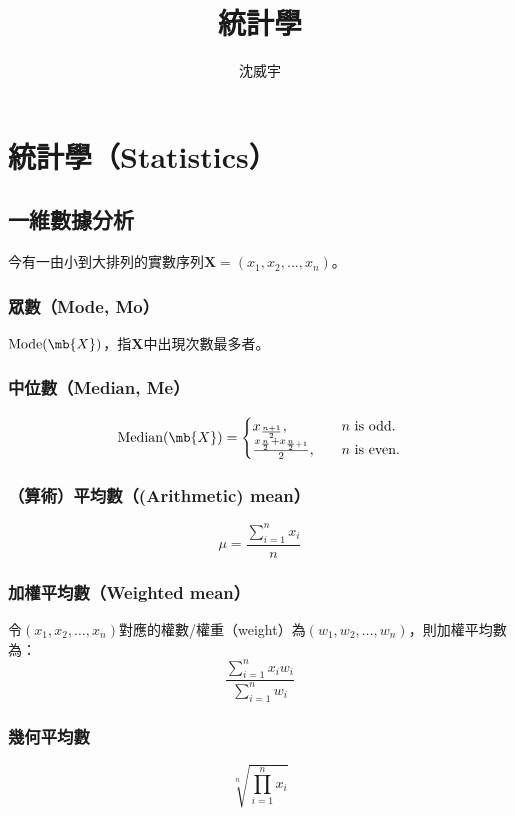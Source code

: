 \documentclass[a4paper,12pt]{report}
\begin{document}
\title{統計學}
\author{沈威宇}
\date{\temtoday}
\titletocdoc
\chapter{統計學（Statistics）}
\section{一維數據分析}
今有一由小到大排列的實數序列\(\mathbf{X}=(x_1,x_2,\ldots,x_n)\)。
\subsection{眾數（Mode, Mo）}
$\text{Mode}(\mb{X})$，指$\mathbf{X}$中出現次數最多者。
\subsection{中位數（Median, Me）}
\[ \text{Median}(\mb{X})=\begin{cases}
x_{\frac{n+1}{2}},\quad & n\text{\ is odd.}\\
\frac{x_{\frac{n}{2}}+x_{\frac{n}{2}+1}}{2},\quad & n\text{\ is even.}
\end{cases} \]
\subsection{（算術）平均數（(Arithmetic) mean）}
\[\mu=\frac{\sum_{i=1}^n x_i}{n}\]
\subsection{加權平均數（Weighted mean）}
令\((x_1,x_2,\ldots,x_n)\)對應的權數/權重（weight）為\((w_1,w_2,\ldots,w_n)\)，則加權平均數為：
\[\frac{\sum_{i=1}^n x_iw_i}{\sum_{i=1}^n w_i}\]
\subsection{幾何平均數}
\[\sqrt[n]{\prod_{i=1}^n x_i}\]
\end{document}
